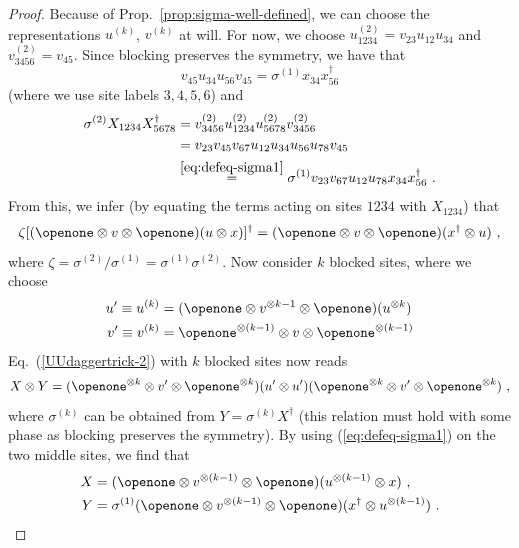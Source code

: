 \documentclass[pra,twocolumn,nofootinbib,superscriptaddress]{revtex4-1}
\begin{document}
\begin{proof}
	Because of Prop.~\ref{prop:sigma-well-defined}, we can choose the
	representations $u^{(k)}$, $v^{(k)}$ at will.  For now, we choose
	$u^{(2)}_{1234}=v_{23}u_{12}u_{34}$ and $v^{(2)}_{3456}=v_{45}$. Since
	blocking preserves the symmetry, we have that
	\begin{equation}
		\label{eq:defeq-sigma1}
		v_{45}u_{34}u_{56}v_{45}=\sigma^{(1)} x_{34} x_{56}^\dagger
	\end{equation}
	(where we use site labels $3,4,5,6$) and
	\begin{align*}
		\sigma^{(2)} X_{1234} X_{5678}^\dagger
		 & =
		v^{(2)}_{3456} u^{(2)}_{1234} u^{(2)}_{5678} v^{(2)}_{3456}
		\\
		 & =
		v_{23}v_{45}v_{67}u_{12}u_{34}u_{56}u_{78}v_{45}
		\\
		 & \stackrel{\eqref{eq:defeq-sigma1}}{=}
		\sigma^{(1)}
		v_{23}v_{67}u_{12}u_{78} x_{34} x_{56}^\dagger\ .
	\end{align*}
	From this, we infer (by equating the terms acting on sites $1234$ with
	$X_{1234}$) that
	\begin{equation}
		\label{eq:unwind-dagger-trick}
		\zeta
		[(\openone\otimes v\otimes\openone)(u\otimes x)]^\dagger =
		(\openone\otimes v\otimes\openone)(x^\dagger\otimes u)\ ,
	\end{equation}
	where $\zeta=\sigma^{(2)}/\sigma^{(1)}=\sigma^{(1)}\sigma^{(2)}$. Now
	consider $k$ blocked sites, where we choose
	\begin{align*}
		u'\equiv u^{(k)}
		 & =
		(\openone\otimes v^{\otimes k-1}\otimes\openone)(u^{\otimes k})
		\\
		v'\equiv v^{(k)}
		 & =
		\openone^{\otimes (k-1)} \otimes v\otimes \openone^{\otimes (k-1)}
	\end{align*}
	Eq.~(\ref{UUdaggertrick-2}) with $k$ blocked sites now reads
	\[
		X\otimes Y = (\openone^{\otimes k}\otimes v'\otimes\openone^{\otimes k})(u'\otimes u')
		(\openone^{\otimes k}\otimes v'\otimes\openone^{\otimes k})\ ,
	\]
	where $\sigma^{(k)}$ can be obtained from $Y=\sigma^{(k)}X^\dagger$ (this
	relation must hold with some phase as blocking preserves the symmetry). By
	using (\ref{eq:defeq-sigma1}) on the two middle sites, we find that
	\begin{align*}
		X & =
		(\openone\otimes v^{\otimes(k-1)}\otimes\openone)
		(u^{\otimes(k-1)}\otimes x)\ ,
		\\
		Y & =\sigma^{(1)}
		(\openone\otimes v^{\otimes(k-1)}\otimes\openone)
		(x^\dagger\otimes u^{\otimes(k-1)})\ .

\end{align*}
\end{proof}
\end{document}

